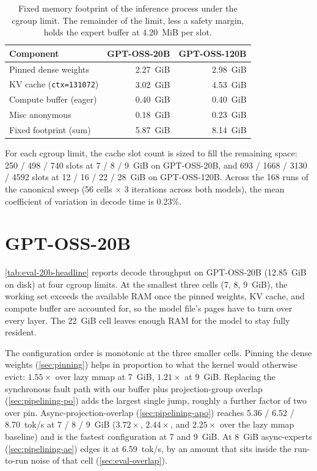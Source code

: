 \begin{table}[htbp]
\centering
\caption[Fixed memory footprint per model]{Fixed memory footprint of the inference process under the cgroup limit. The remainder of the limit, less a safety margin, holds the expert buffer at 4.20~MiB per slot.}
\label{tab:eval-fixed-footprint}
\begin{tabular}{lrr}
\toprule
Component & GPT-OSS-20B & GPT-OSS-120B \\
\midrule
Pinned dense weights         & 2.27~GiB & 2.98~GiB \\
KV cache (\texttt{ctx=131072}) & 3.02~GiB & 4.53~GiB \\
Compute buffer (eager)       & 0.40~GiB & 0.40~GiB \\
Misc anonymous               & 0.18~GiB & 0.23~GiB \\
\midrule
Fixed footprint (sum)        & 5.87~GiB & 8.14~GiB \\
\bottomrule
\end{tabular}
\end{table}

For each cgroup limit, the cache slot count is sized to fill the remaining space: 250 / 498 / 740 slots at 7 / 8 / 9~GiB on GPT-OSS-20B, and 693 / 1668 / 3130 / 4592 slots at 12 / 16 / 22 / 28~GiB on GPT-OSS-120B.
Across the 168 runs of the canonical sweep (56 cells $\times$ 3 iterations across both models), the mean coefficient of variation in decode time is 0.23\%.


\section{GPT-OSS-20B}\label{sec:eval-20b}

\autoref{tab:eval-20b-headline} reports decode throughput on GPT-OSS-20B (12.85~GiB on disk) at four cgroup limits.
At the smallest three cells (7, 8, 9~GiB), the working set exceeds the available RAM once the pinned weights, KV cache, and compute buffer are accounted for, so the model file's pages have to turn over every layer.
The 22~GiB cell leaves enough RAM for the model to stay fully resident.



The configuration order is monotonic at the three smaller cells.
Pinning the dense weights (\autoref{sec:pinning}) helps in proportion to what the kernel would otherwise evict: $1.55\times$ over lazy mmap at 7~GiB, $1.21\times$ at 9~GiB.
Replacing the synchronous fault path with our buffer plus projection-group overlap (\autoref{sec:pipelining-po}) adds the largest single jump, roughly a further factor of two over pin.
Async-projection-overlap (\autoref{sec:pipelining-apo}) reaches 5.36 / 6.52 / 8.70~tok/s at 7 / 8 / 9~GiB ($3.72\times$, $2.44\times$, and $2.25\times$ over the lazy mmap baseline) and is the fastest configuration at 7 and 9~GiB.
At 8~GiB async-experts (\autoref{sec:pipelining-ae}) edges it at 6.59~tok/s, by an amount that sits inside the run-to-run noise of that cell (\autoref{sec:eval-overlap}).

